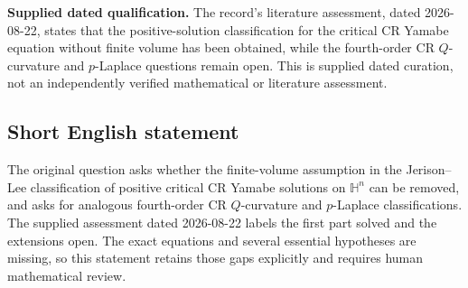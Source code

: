 \documentclass[11pt]{article}
\begin{document}
\textbf{Supplied dated qualification.} The record's literature assessment, dated 2026-08-22, states that the positive-solution classification for the critical CR Yamabe equation without finite volume has been obtained, while the fourth-order CR \(Q\)-curvature and \(p\)-Laplace questions remain open. This is supplied dated curation, not an independently verified mathematical or literature assessment.
\subsection{Short English statement}
The original question asks whether the finite-volume assumption in the Jerison--Lee classification of positive critical CR Yamabe solutions on \(\mathbb H^n\) can be removed, and asks for analogous fourth-order CR \(Q\)-curvature and \(p\)-Laplace classifications. The supplied assessment dated 2026-08-22 labels the first part solved and the extensions open. The exact equations and several essential hypotheses are missing, so this statement retains those gaps explicitly and requires human mathematical review.
\end{document}
